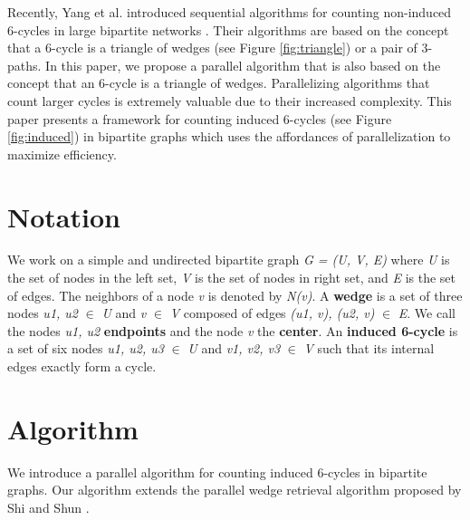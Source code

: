 \documentclass[11pt]{article}
\begin{document}
Recently, Yang et al. introduced sequential algorithms for counting non-induced 6-cycles in large bipartite networks \cite{yang2020efficient}.
Their algorithms are based on the concept that a 6-cycle is a triangle of wedges (see Figure \ref{fig:triangle}) or a pair of 3-paths.
In this paper, we propose a parallel algorithm that is also based on the concept that an 6-cycle is a triangle of wedges.
Parallelizing algorithms that count larger cycles is extremely valuable due to their increased complexity.
This paper presents a framework for counting induced 6-cycles (see Figure \ref{fig:induced}) in bipartite graphs which uses the affordances of parallelization to maximize efficiency.

\section{Notation}
We work on a simple and undirected bipartite graph \textit{G = (U, V, E)} where \textit{U} is the set of nodes in the left set, \textit{V} is the set of nodes in right set, and \textit{E} is the set of edges.
The neighbors of a node \textit{v} is denoted by \textit{N(v)}.
A \textbf{wedge} is a set of three nodes \textit{u1, u2} $\in$ \textit{U} and \textit{v} $\in$ \textit{V} composed of edges \textit{(u1, v), (u2, v)} $\in$ \textit{E}. 
We call the nodes \textit{u1, u2} \textbf{endpoints} and the node \textit{v} the \textbf{center}.
An \textbf{induced 6-cycle} is a set of six nodes \textit{u1, u2, u3} $\in$ \textit{U} and \textit{v1, v2, v3} $\in$ \textit{V} such that its internal edges exactly form a cycle.

\section{Algorithm}

We introduce a parallel algorithm for counting induced 6-cycles in bipartite graphs.
Our algorithm extends the parallel wedge retrieval algorithm proposed by Shi and Shun \cite{shi2019parallel}.
\end{document}
